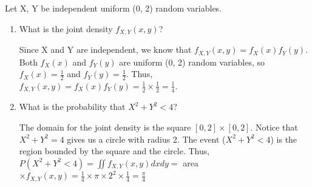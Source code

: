 \question Let X, Y be independent uniform (0, 2) random variables. 

\begin{enumerate}[label=(\alph*)] 
\item What is the joint density $f_{X, Y}(x, y)$? 
\begin{solution}[4cm] 
Since X and Y are independent, we know that $f_{X, Y}(x, y) = f_X(x) f_Y(y)$. \\ 
Both $f_X(x)$ and $f_Y(y)$ are uniform (0, 2) random variables, so $f_X(x) = \frac{1}{2}$ and $f_Y(y) = \frac{1}{2}$. Thus, $f_{X, Y}(x, y) = f_X(x) f_Y(y) =  \frac{1}{2} \times \frac{1}{2} =  \frac{1}{4}$. 
\end{solution}

\item What is the probability that $X^2 + Y^2 < 4$? 
\begin{solution}[4cm]
The domain for the joint density is the square $[0, 2] \times [0, 2]$. Notice that $X^2 + Y^2 = 4$ gives us a circle with radius 2. The event ($X^2 + Y^2 < 4$) is the region bounded by the square and the circle. Thus, $P(X^2 + Y^2 < 4) = \iint f_{X, Y} (x, y) dx dy =$ area $\times f_{X, Y} (x, y) = \frac{1}{4} \times \pi \times 2^2 \times \frac{1}{4} = \frac{\pi}{4}$ 
\end{solution}
\end{enumerate}
